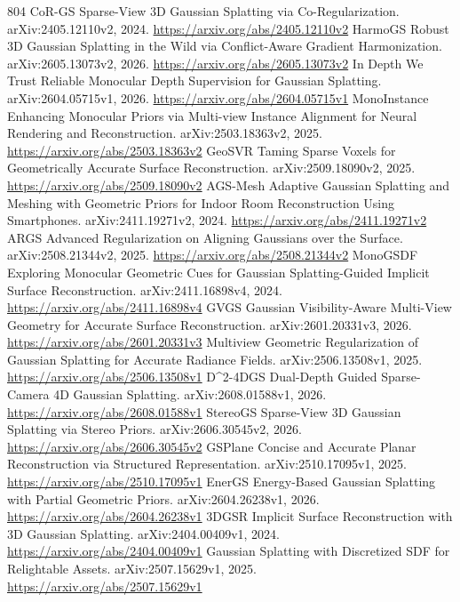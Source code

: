 \documentclass[11pt]{article}
\begin{document}
\begin{thebibliography}{804}
 CoR-GS Sparse-View 3D Gaussian Splatting via Co-Regularization. arXiv:2405.12110v2, 2024. \url{https://arxiv.org/abs/2405.12110v2}
 HarmoGS Robust 3D Gaussian Splatting in the Wild via Conflict-Aware Gradient Harmonization. arXiv:2605.13073v2, 2026. \url{https://arxiv.org/abs/2605.13073v2}
 In Depth We Trust Reliable Monocular Depth Supervision for Gaussian Splatting. arXiv:2604.05715v1, 2026. \url{https://arxiv.org/abs/2604.05715v1}
 MonoInstance Enhancing Monocular Priors via Multi-view Instance Alignment for Neural Rendering and Reconstruction. arXiv:2503.18363v2, 2025. \url{https://arxiv.org/abs/2503.18363v2}
 GeoSVR Taming Sparse Voxels for Geometrically Accurate Surface Reconstruction. arXiv:2509.18090v2, 2025. \url{https://arxiv.org/abs/2509.18090v2}
 AGS-Mesh Adaptive Gaussian Splatting and Meshing with Geometric Priors for Indoor Room Reconstruction Using Smartphones. arXiv:2411.19271v2, 2024. \url{https://arxiv.org/abs/2411.19271v2}
 ARGS Advanced Regularization on Aligning Gaussians over the Surface. arXiv:2508.21344v2, 2025. \url{https://arxiv.org/abs/2508.21344v2}
 MonoGSDF Exploring Monocular Geometric Cues for Gaussian Splatting-Guided Implicit Surface Reconstruction. arXiv:2411.16898v4, 2024. \url{https://arxiv.org/abs/2411.16898v4}
 GVGS Gaussian Visibility-Aware Multi-View Geometry for Accurate Surface Reconstruction. arXiv:2601.20331v3, 2026. \url{https://arxiv.org/abs/2601.20331v3}
 Multiview Geometric Regularization of Gaussian Splatting for Accurate Radiance Fields. arXiv:2506.13508v1, 2025. \url{https://arxiv.org/abs/2506.13508v1}
 D\textasciicircum{}2-4DGS Dual-Depth Guided Sparse-Camera 4D Gaussian Splatting. arXiv:2608.01588v1, 2026. \url{https://arxiv.org/abs/2608.01588v1}
 StereoGS Sparse-View 3D Gaussian Splatting via Stereo Priors. arXiv:2606.30545v2, 2026. \url{https://arxiv.org/abs/2606.30545v2}
 GSPlane Concise and Accurate Planar Reconstruction via Structured Representation. arXiv:2510.17095v1, 2025. \url{https://arxiv.org/abs/2510.17095v1}
 EnerGS Energy-Based Gaussian Splatting with Partial Geometric Priors. arXiv:2604.26238v1, 2026. \url{https://arxiv.org/abs/2604.26238v1}
 3DGSR Implicit Surface Reconstruction with 3D Gaussian Splatting. arXiv:2404.00409v1, 2024. \url{https://arxiv.org/abs/2404.00409v1}
 Gaussian Splatting with Discretized SDF for Relightable Assets. arXiv:2507.15629v1, 2025. \url{https://arxiv.org/abs/2507.15629v1}

\end{thebibliography}
\end{document}

